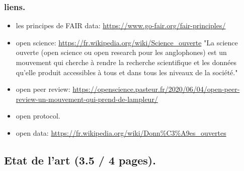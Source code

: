 \documentclass[11pt]{article}
\begin{document}
\subsubsection{liens.}
\label{sec:orgd67ab9a}
\begin{itemize}
\item les principes de FAIR data: \url{https://www.go-fair.org/fair-principles/}
\item open science: \url{https://fr.wikipedia.org/wiki/Science\_ouverte}
"La science ouverte (open science ou open research pour les
anglophones) est un mouvement qui cherche à rendre la recherche
scientifique et les données qu'elle produit accessibles à tous et
dans tous les niveaux de la société."
\item open peer review:
\url{https://openscience.pasteur.fr/2020/06/04/open-peer-review-un-mouvement-qui-prend-de-lampleur/}
\item open protocol.
\item open data: \url{https://fr.wikipedia.org/wiki/Donn\%C3\%A9es\_ouvertes}
\end{itemize}

\subsection{Etat de l'art (3.5 / 4 pages).}
\label{sec:org2b974d2}
\end{document}
